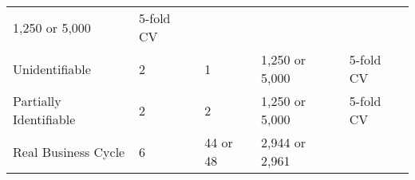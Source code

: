 \documentclass[]{article}
\begin{document}
\begin{longtable}[]{@{}lllll@{}}
\begin{minipage}[t]{0.15\columnwidth}
1,250 or 5,000\strut
\end{minipage} & \begin{minipage}[t]{0.15\columnwidth}\raggedright
5-fold CV\strut
\end{minipage}\tabularnewline
\begin{minipage}[t]{0.20\columnwidth}\raggedright
Unidentifiable\strut
\end{minipage} & \begin{minipage}[t]{0.15\columnwidth}\raggedright
2\strut
\end{minipage} & \begin{minipage}[t]{0.21\columnwidth}\raggedright
1\strut
\end{minipage} & \begin{minipage}[t]{0.15\columnwidth}\raggedright
1,250 or 5,000\strut
\end{minipage} & \begin{minipage}[t]{0.15\columnwidth}\raggedright
5-fold CV\strut
\end{minipage}\tabularnewline
\begin{minipage}[t]{0.20\columnwidth}\raggedright
Partially Identifiable\strut
\end{minipage} & \begin{minipage}[t]{0.15\columnwidth}\raggedright
2\strut
\end{minipage} & \begin{minipage}[t]{0.21\columnwidth}\raggedright
2\strut
\end{minipage} & \begin{minipage}[t]{0.15\columnwidth}\raggedright
1,250 or 5,000\strut
\end{minipage} & \begin{minipage}[t]{0.15\columnwidth}\raggedright
5-fold CV\strut
\end{minipage}\tabularnewline
\begin{minipage}[t]{0.20\columnwidth}\raggedright
Real Business Cycle\strut
\end{minipage} & \begin{minipage}[t]{0.15\columnwidth}\raggedright
6\strut
\end{minipage} & \begin{minipage}[t]{0.21\columnwidth}\raggedright
44 or 48\strut
\end{minipage} & \begin{minipage}[t]{0.15\columnwidth}\raggedright
2,944 or 2,961\strut
\end{minipage} & \begin{minipage}[t]{0.15\columnwidth}\raggedright

\end{minipage}
\end{longtable}
\end{document}
